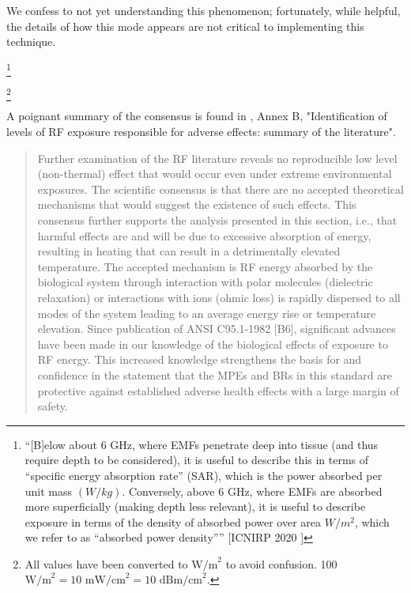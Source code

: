 \documentclass[fleqn,10pt]{article}
\begin{document}
\begin{multicols}{1}
{We confess to not yet understanding this phenomenon; fortunately, while helpful, the details of how this mode appears are not critical to implementing this technique.}

\footnote{``{[B]elow about 6 GHz, where EMFs penetrate deep into tissue (and thus require depth to be considered), it is useful to describe this in terms of “specific energy absorption rate” (SAR), which is the power absorbed per unit mass $(W/kg)$. Conversely, above 6 GHz, where EMFs are absorbed more superficially (making depth less relevant), it is useful to describe exposure in terms of the density of absorbed power over area $W/m^2$, which we refer to as “absorbed power density”}'' [ICNIRP 2020 \faExternalLink] }



\footnote{All values have been converted to $\text{W/m}^2$ to avoid confusion. 100 $\text{W/m}^2 = 10 \text{ mW/cm}^2 = 10 \text{ dBm/cm}^2$.}



\end{multicols}
\clearpage




A poignant summary of the consensus is found in \cite{IEEE2006}, Annex B, "Identification of levels of RF exposure responsible for adverse effects: summary of the literature".

\begin{quote}
Further examination of the RF literature reveals no reproducible low level (non-thermal) effect that would
occur even under extreme environmental exposures. The scientific consensus is that there are no accepted
theoretical mechanisms that would suggest the existence of such effects. This consensus further supports the
analysis presented in this section, i.e., that harmful effects are and will be due to excessive absorption of
energy, resulting in heating that can result in a detrimentally elevated temperature. The accepted mechanism
is RF energy absorbed by the biological system through interaction with polar molecules (dielectric relaxation) or interactions with ions (ohmic loss) is rapidly dispersed to all modes of the system leading to an
average energy rise or temperature elevation. Since publication of ANSI C95.1-1982 [B6], significant
advances have been made in our knowledge of the biological effects of exposure to RF energy. This
increased knowledge strengthens the basis for and confidence in the statement that the MPEs and BRs in this
standard are protective against established adverse health effects with a large margin of safety.

\end{quote}
\end{document}
